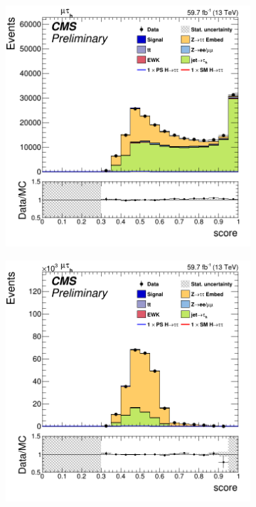 \begin{figure}
    \begin{subfigure}[b]{0.5\linewidth}
        \centering
        \includegraphics[scale=0.28]{Chapitre7/Images/CtrlPlots/2018/BDTscoreJetFakes.png} 
        \caption{} 
        \vspace{0.5ex}
    \end{subfigure}
    \begin{subfigure}[b]{0.5\linewidth}
        \centering
        \includegraphics[scale=0.28]{Chapitre7/Images/CtrlPlots/2018/BDTscoreZTT.png} 

\end{subfigure}
\end{figure}
